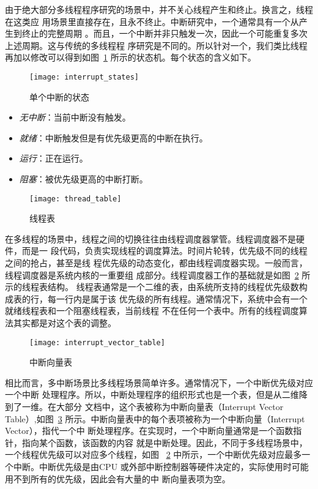 由于绝大部分多线程程序研究的场景中，并不关心线程产生和终止。换言之，线程在这类应
用场景里直接存在，且永不终止。中断研究中，一个通常具有一个从产生到终止的完整周期
。而且，一个中断并非只触发一次，因此一个可能重复多次上述周期。这与传统的多线程程
序研究是不同的。所以针对一个，我们类比线程再加以修改可以得到如图~\ref{fig:interrupt_state} 
所示的状态机。每个状态的含义如下。

\begin{figure}[H]
	\centering
	\texttt{[image: interrupt\_states]}
	\caption{单个中断的状态}
	\label{fig:interrupt_state}
\end{figure}

\begin{itemize}
	\item \emph{无中断}：当前中断没有触发。
	\item \emph{就绪}：中断触发但是有优先级更高的中断在执行。
	\item \emph{运行}：正在运行。
	\item \emph{阻塞}：被优先级更高的中断打断。
\end{itemize}

\begin{figure}[H]
	\centering
	\texttt{[image: thread\_table]}
	\caption{线程表}
	\label{fig:thread_table}
\end{figure}

在多线程的场景中，线程之间的切换往往由线程调度器掌管。线程调度器不是硬件，而是一
段代码，负责实现线程的调度算法。时间片轮转，优先级不同的线程之间的抢占，甚至是线
程优先级的动态变化，都由线程调度器实现。一般而言，线程调度器是系统内核的一重要组
成部分。线程调度器工作的基础就是如图~\ref{fig:thread_table} 所示的线程表结构。
线程表通常是一个二维的表，由系统所支持的线程优先级数构成表的行，每一行内是属于该
优先级的所有线程。通常情况下，系统中会有一个就绪线程表和一个阻塞线程表，当前线程
不在任何一个表中。所有的线程调度算法其实都是对这个表的调整。

\begin{figure}[H]
	\centering
	\texttt{[image: interrupt\_vector\_table]}
	\caption{中断向量表}
	\label{fig:interrupt_vector_table}
\end{figure}

相比而言，多中断场景比多线程场景简单许多。通常情况下，一个中断优先级对应一个中断
处理程序。所以，中断处理程序的组织形式也是一个表，但是从二维降到了一维。在大部分
文档中，这个表被称为中断向量表（Interrupt Vector Table）,如图~\ref{fig:interrupt_vector_table} 
所示。中断向量表中的每个表项被称为一个中断向量（Interrupt Vector），指代一个中
断处理程序。在实现时，一个中断向量通常是一个函数指针，指向某个函数，该函数的内容
就是中断处理。因此，不同于多线程场景中，一个线程优先级可以对应多个线程，如图~
\ref{fig:thread_table} 中所示，一个中断优先级对应最多一个中断。中断优先级是由CPU
或外部中断控制器等硬件决定的，实际使用时可能用不到所有的优先级，因此会有大量的中
断向量表项为空。

